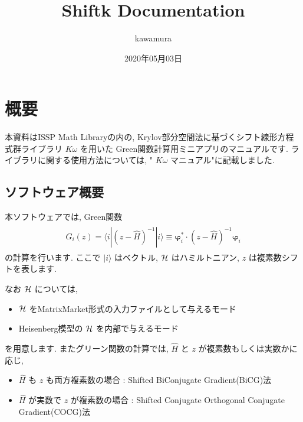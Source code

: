 \documentclass[letterpaper,10pt,dvipdfmx,openany]{sphinxmanual}
\title{Shiftk Documentation}
\date{2020年05月03日}
\author{kawamura}
\begin{document}
\pagestyle{empty}
\sphinxmaketitle
\pagestyle{plain}
\sphinxtableofcontents
\pagestyle{normal}
\label{\detokenize{index::doc}}



\chapter{概要}
\label{\detokenize{shiftk_overview_ja:id1}}\label{\detokenize{shiftk_overview_ja::doc}}
本資料はISSP Math
Libraryの内の, Krylov部分空間法に基づくシフト線形方程式群ライブラリ
\(K\omega\) を用いた Green関数計算用ミニアプリのマニュアルです.
ライブラリに関する使用方法については, " \(K\omega\) マニュアル"に記載しました.


\section{ソフトウェア概要}
\label{\detokenize{shiftk_overview_ja:id2}}
本ソフトウェアでは, Green関数
\begin{equation*}
\begin{split}\begin{align}
G_{i}(z) =
\langle i | (z-{\hat H})^{-1}| i \rangle
\equiv
{\boldsymbol \varphi}_i^{*} \cdot (z-{\hat H})^{-1} {\boldsymbol \varphi}_i
\end{align}\end{split}
\end{equation*}
の計算を行います.
ここで \(| i \rangle\) はベクトル, \({\cal H}\) はハミルトニアン,
\(z\) は複素数シフトを表します.

なお \({\cal H}\) については,
\begin{itemize}
\item {} 
\({\cal H}\) をMatrixMarket形式の入力ファイルとして与えるモード

\item {} 
Heisenberg模型の \({\cal H}\) を内部で与えるモード

\end{itemize}

を用意します.
またグリーン関数の計算では, \({\hat H}\) と \(z\) が複素数もしくは実数かに応じ,
\begin{itemize}
\item {} 
\({\hat H}\) も \(z\) も両方複素数の場合 : Shifted
Bi\sphinxhyphen{}Conjugate Gradient(BiCG)法

\item {} 
\({\hat H}\) が実数で \(z\) が複素数の場合 : Shifted
Conjugate Orthogonal Conjugate Gradient(COCG)法

\end{itemize}
\end{document}
